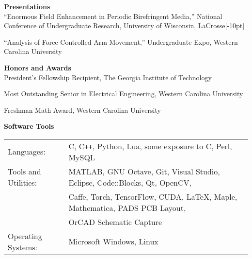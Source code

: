 \documentclass[14pt,letterpaper]{extarticle}
\begin{document}
\bigskip
\noindent\textbf{\large{Presentations}}\vspace{5.3pt}\\
\footnotesize{``Enormous  Field  Enhancement  in  Periodic  Birefringent Media,''
National Conference of Undergraduate Research, University of Wisconsin, LaCrosse}[-10pt]

\medskip\noindent
\footnotesize{``Analysis of Force Controlled Arm Movement,'' Undergraduate Expo, Western Carolina University}

\bigskip
\noindent\textbf{\large{Honors and Awards}}\vspace{5.3pt}\\
\noindent\footnotesize{President's Fellowship Recipient, The Georgia Institute of Technology}

\medskip
\noindent\footnotesize{Most Outstanding Senior in Electrical Engineering, Western Carolina University}

\medskip
\noindent\footnotesize{Freshman Math Award, Western Carolina University}

\bigskip
\noindent\textbf{\large{Software Tools}}

\medskip\noindent
\begin{tabular}{@{}lp{11cm}@{}}
\footnotesize{Languages:} & \footnotesize{C, C\texttt{++}, Python, Lua, some exposure to C\raisebox{2pt}{\texttt{\#}}, Perl, MySQL}\vspace{0.5mm}\\
\footnotesize{Tools and Utilities:} & \footnotesize{MATLAB, GNU Octave, Git, Visual Studio, Eclipse, Code::Blocks, Qt, OpenCV,}\\
                                    & \footnotesize{Caffe, Torch, TensorFlow, CUDA, \LaTeX, Maple, Mathematica, PADS PCB Layout,}\\
                                    & \footnotesize{OrCAD Schematic Capture}\vspace{0.5mm}\\
\footnotesize{Operating Systems:}   & \footnotesize{Microsoft Windows, Linux}\\
\end{tabular}
\end{document}
